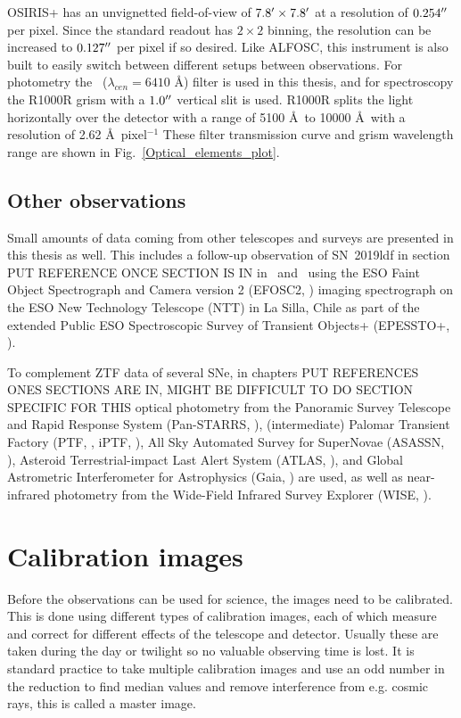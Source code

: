 \documentclass[a4paper,oneside,12pt, class=Latex/Classes/PhDthesisPSnPDF, crop=false]{standalone}
\begin{document}
OSIRIS+ has an unvignetted field-of-view of $7.8^{\prime}\times7.8^{\prime}$ at a resolution of $0.254^{\prime\prime}$ per pixel. Since the standard readout has $2\times2$ binning, the resolution can be increased to $0.127^{\prime\prime}$ per pixel if so desired. Like ALFOSC, this instrument is also built to easily switch between different setups between observations. For photometry the \ztfr~($\lambda_{cen} =6410$ \AA) filter is used in this thesis, and for spectroscopy the R1000R grism with a $1.0^{\prime\prime}$ vertical slit is used. R1000R splits the light horizontally over the detector with a range of 5100 \AA\ to 10000 \AA\ with a resolution of 2.62 \AA\ pixel$^{-1}$ These filter transmission curve and grism wavelength range are shown in Fig.~\ref{Optical_elements_plot}.


\subsection{Other observations}
Small amounts of data coming from other telescopes and surveys are presented in this thesis as well. This includes a follow-up observation of SN~2019ldf in section \color{red} PUT REFERENCE ONCE SECTION IS IN \color{black} in \ztfg\ and \ztfr\ using the ESO Faint Object Spectrograph and Camera version 2 (EFOSC2, \citealt{EFOSC2}) imaging spectrograph on the ESO New Technology Telescope (NTT) in La Silla, Chile as part of the extended Public ESO Spectroscopic Survey of Transient Objects+ (EPESSTO+, \citealt{PESSTO}).

To complement ZTF data of several SNe, in chapters \color{red} PUT REFERENCES ONES SECTIONS ARE IN, MIGHT BE DIFFICULT TO DO SECTION SPECIFIC FOR THIS \color{black} optical photometry from the Panoramic Survey Telescope and Rapid Response System (Pan-STARRS, \citealt{Pan-STARRS1}), (intermediate) Palomar Transient Factory (PTF, \citealt{PTF_1, PTF_2}, iPTF, \citealt{iPTF}), All Sky Automated Survey for SuperNovae (ASASSN, \citealt{ASASSN_paper1, ASASSN_catalog}), Asteroid Terrestrial-impact Last Alert System (ATLAS, \citealt{ATLAS}),  and Global Astrometric Interferometer for Astrophysics (Gaia, \citealt{Gaia}) are used, as well as near-infrared photometry from the Wide-Field Infrared Survey Explorer (WISE, \citealt{WISE}).


\section{Calibration images}
\label{calibration}
Before the observations can be used for science, the images need to be calibrated. This is done using different types of calibration images, each of which measure and correct for different effects of the telescope and detector. Usually these are taken during the day or twilight so no valuable observing time is lost. It is standard practice to take multiple calibration images and use an odd number in the reduction to find median values and remove interference from e.g. cosmic rays, this is called a master image.
\end{document}
